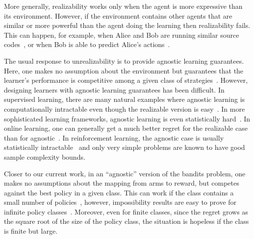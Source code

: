 More generally, realizability works only when the agent is more expressive than its environment. However, if the environment contains other agents that are similar or more powerful than the agent doing the learning then realizability fails. This can happen, for example, when Alice and Bob are running similar source codes~\citep{tennenholtz2004program,barasz2014robust}, or when Bob is able to predict Alice's actions~\citep{critch2019bounded,oesterheld2019robust}. 

The usual response to unrealizability is to provide agnostic learning guarantees. Here, one makes no assumption about the environment but guarantees that the learner's performance is competitive among a given class of strategies~\citep{kearns1994agnostic,bendavid2009agnostic}. However, designing learners with agnostic learning guarantees has been difficult. In supervised learning, there are many natural examples where agnostic learning is computationally intractable even though the realizable version is easy~\citep{daniely2016halfspaces,daniely2016dnf}. In more sophisticated learning frameworks, agnostic learning is even statistically hard~\citep{krishnamurthy2016pac,sekhari2021agnostic}. In online learning, one can generally get a much better regret for the realizable case than for agnostic~\citep{littlestone1988learning,bendavid2009agnostic}. In reinforcement learning, the agnostic case is usually statistically intractable~\citep{li2025agnostic,jia2023agnostic,sekhari2021agnostic} and only very simple problems are known to have good sample complexity bounds.

Closer to our current work, in an ``agnostic'' version of the bandits problem, one makes no assumptions about the mapping from arms to reward, but competes against the best policy in a given class. This can work if the class contains a small number of policies~\citep{auer2002nonstochastic}, however, impossibility results are easy to prove for infinite policy classes~\citep{bubeck2011pure,bubeck2011xarmed}. Moreover, even for finite classes, since the regret grows as the square root of the size of the policy class, the situation is hopeless if the class is finite but large. 

